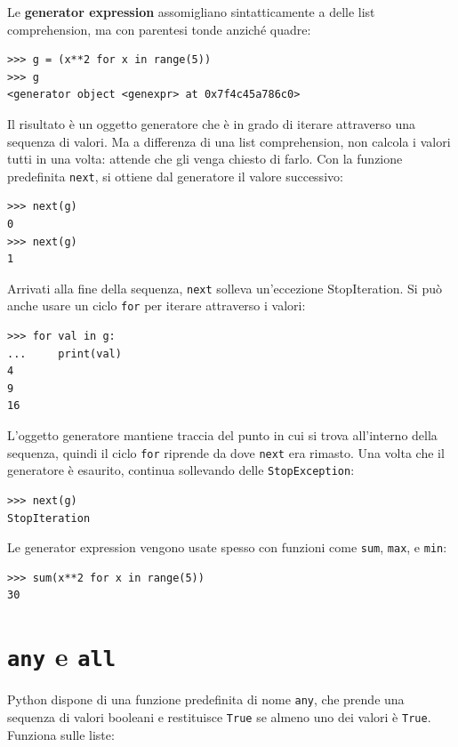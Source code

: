 \documentclass[10pt]{book}
\begin{document}
Le {\bf generator expression} assomigliano sintatticamente a delle list comprehension, ma con parentesi tonde anziché quadre:

\begin{verbatim}
>>> g = (x**2 for x in range(5))
>>> g
<generator object <genexpr> at 0x7f4c45a786c0>
\end{verbatim}
%
Il risultato è un oggetto generatore che è in grado di iterare attraverso una sequenza di valori. Ma a differenza di una list comprehension, non calcola i valori tutti in una volta: attende che gli venga chiesto di farlo.
Con la funzione predefinita {\tt next}, si ottiene dal generatore il valore successivo:

\begin{verbatim}
>>> next(g)
0
>>> next(g)
1
\end{verbatim}
%
Arrivati alla fine della sequenza, {\tt next} solleva un'eccezione
StopIteration.  Si può anche usare un ciclo {\tt for} per iterare attraverso i valori:

\begin{verbatim}
>>> for val in g:
...     print(val)
4
9
16
\end{verbatim}
%
L'oggetto generatore mantiene traccia del punto in cui si trova all'interno della sequenza, quindi il ciclo {\tt for} riprende da dove {\tt next} era rimasto. Una volta che il generatore è esaurito, continua sollevando delle {\tt StopException}:

\begin{verbatim}
>>> next(g)
StopIteration
\end{verbatim}

Le generator expression vengono usate spesso con funzioni come {\tt sum},
{\tt max}, e {\tt min}:

\begin{verbatim}
>>> sum(x**2 for x in range(5))
30
\end{verbatim}


\section{{\tt any} e {\tt all}}

Python dispone di una funzione predefinita di nome {\tt any}, che prende una sequenza di valori booleani e restituisce {\tt True} se almeno uno dei valori è {\tt True}.  Funziona sulle liste:
\end{document}
